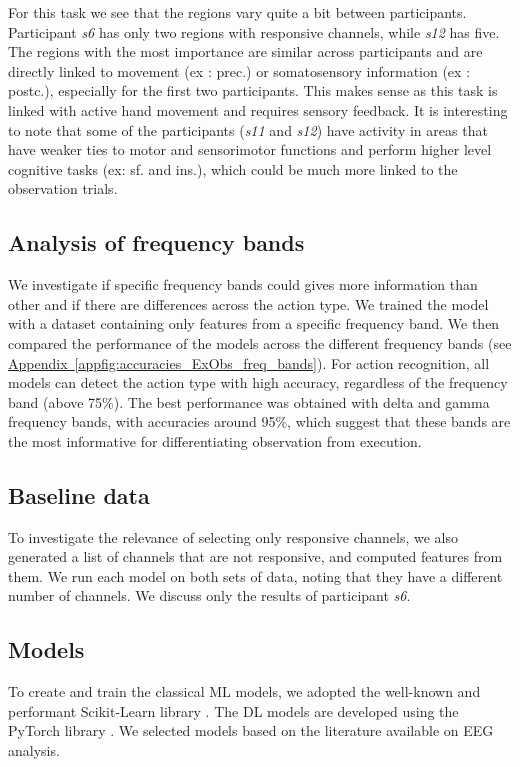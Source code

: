 \documentclass[10pt,conference,compsocconf]{IEEEtran}
\newcommand{\aref}[1]{\hyperref[#1]{Appendix~\ref*{#1}}}
\begin{document}
\vspace{-1.5em}
For this task we see that the regions vary quite a bit between participants. Participant \textit{s6} has only two regions with responsive channels, while \textit{s12} has five. The regions with the most importance are similar across participants and are directly linked to movement (ex : prec.)\cite{precentral_gyrus} or somatosensory information (ex : postc.)\cite{postcentral_gyrus}, especially for the first two participants. This makes sense as this task is linked with active hand movement and requires sensory feedback. It is interesting to note that some of the participants (\textit{s11} and \textit{s12}) have activity in areas that have weaker ties to motor and sensorimotor functions and perform higher level cognitive tasks (ex: sf. and ins.)\cite{superior_frontal_gyrus}\cite{superior_frontal_gyrus_wikipedia}\cite{insula}, which could be much more linked to the observation trials.

\subsection{Analysis of frequency bands}
We investigate if specific frequency bands could gives more information than other and if there are differences across the action type. We trained the model with a dataset containing only features from a specific frequency band. We then compared the performance of the models across the different frequency bands (see \aref{appfig:accuracies_ExObs_freq_bands}). For action recognition, all models can detect the action type with high accuracy, regardless of the frequency band (above 75\%). The best performance was obtained with delta and gamma frequency bands, with accuracies around 95\%, which suggest that these bands are the most informative for differentiating observation from execution.

\subsection{Baseline data}
To investigate the relevance of selecting only responsive channels, we also generated a list of channels that are not responsive, and computed features from them. We run each model on both sets of data, noting that they have a different number of channels. We discuss only the results of participant \textit{s6}.

\subsection{Models}
To create and train the classical ML models, we adopted the well-known and performant Scikit-Learn library \cite{scikitlearn}. The DL models are developed using the PyTorch library \cite{pytorch}. We selected models based on the literature available on EEG analysis.
\end{document}
